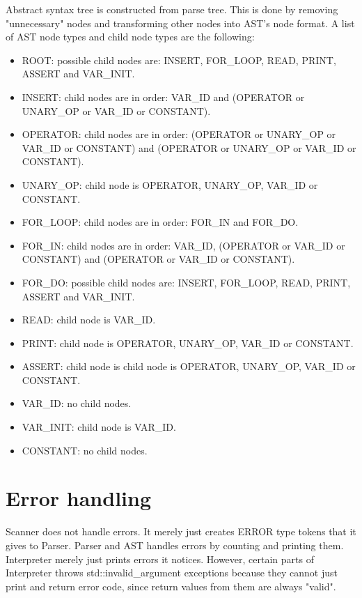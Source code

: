 \documentclass[english,11pt,twoside,a4paper]{article}
\begin{document}
Abstract syntax tree is constructed from parse tree. This is done by removing "unnecessary" nodes and transforming other nodes into AST's node format. A list of AST node types and child node types are the following:

\begin{itemize}
	\item ROOT: possible child nodes are: INSERT, FOR\_LOOP, READ, PRINT, ASSERT and VAR\_INIT.
	\item INSERT: child nodes are in order: VAR\_ID and (OPERATOR or UNARY\_OP or VAR\_ID or CONSTANT).
	\item OPERATOR: child nodes are in order: (OPERATOR or UNARY\_OP or VAR\_ID or CONSTANT) and (OPERATOR or UNARY\_OP or VAR\_ID or CONSTANT).
	\item UNARY\_OP: child node is OPERATOR, UNARY\_OP, VAR\_ID or CONSTANT.
    \item FOR\_LOOP: child nodes are in order: FOR\_IN and FOR\_DO.
    \item FOR\_IN: child nodes are in order: VAR\_ID, (OPERATOR or VAR\_ID or CONSTANT) and (OPERATOR or VAR\_ID or CONSTANT).
    \item FOR\_DO: possible child nodes are: INSERT, FOR\_LOOP, READ, PRINT, ASSERT and VAR\_INIT.
    \item READ: child node is VAR\_ID.
    \item PRINT: child node is OPERATOR, UNARY\_OP, VAR\_ID or CONSTANT.
    \item ASSERT: child node is child node is OPERATOR, UNARY\_OP, VAR\_ID or CONSTANT.
    \item VAR\_ID: no child nodes.
    \item VAR\_INIT: child node is VAR\_ID.
    \item CONSTANT: no child nodes.
\end{itemize}

\section{Error handling}

Scanner does not handle errors. It merely just creates ERROR type tokens that it gives to Parser. Parser and AST handles errors by counting and printing them. Interpreter merely just prints errors it notices. However, certain parts of Interpreter throws std::invalid\_argument exceptions because they cannot just print and return error code, since return values from them are always "valid".
\end{document}

